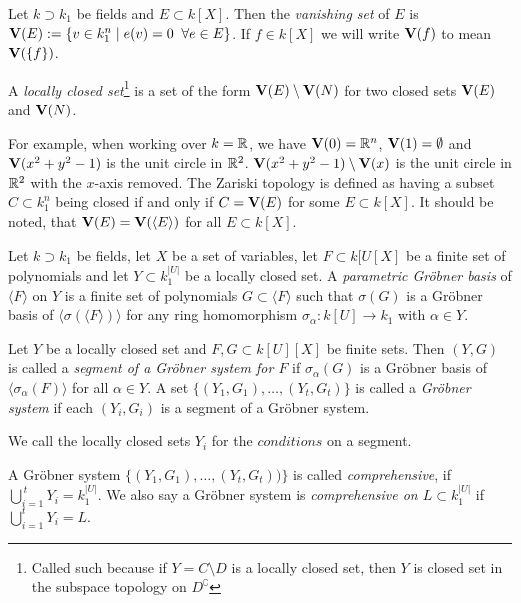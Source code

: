 \begin{definition}
  Let $k \supset k_{1}$ be fields and $E \subset k[X]$. Then the \textit{vanishing set} of $E$ is $\operatorname{\mathbf V}(E) := \{v \in k_{1}^{n} \mid e(v) = 0 \;\; \forall e \in E\}$.  If $f \in k[X]$ we will write $\operatorname{\mathbf V}(f)$ to mean $\operatorname{\mathbf V}(\{f\})$.

  A \textit{locally closed set}\footnote{Called such because if $Y = C \setminus D$ is a locally closed set, then $Y$ is closed set in the subspace topology on $D^{\complement}$} is a set of the form $\operatorname{\mathbf V}(E) \setminus \operatorname{\mathbf V}(N)$ for two closed sets $\operatorname{\mathbf V}(E)$ and $\operatorname{\mathbf V}(N)$.
\end{definition}

For example, when working over $k = \mathbb{R}$, we have $\operatorname{\mathbf V}(0) = \mathbb{R}^{n}$, $\operatorname{\mathbf V}(1) = \emptyset$ and $\operatorname{\mathbf V}(x^{2} + y^{2} - 1)$ is the unit circle in $\mathbb{R}^{2}$. $\operatorname{\mathbf V}(x^{2} + y^{2} - 1) \setminus \operatorname{\mathbf V}(x)$ is the unit circle in $\mathbb{R}^{2}$ with the  $x$-axis removed. The Zariski topology is defined as having a subset $C \subset k_{1}^{n}$ being closed if and only if $C = \operatorname{\mathbf V}(E)$ for some $E \subset k[X]$. It should be noted, that $\operatorname{\mathbf V}(E) = \operatorname{\mathbf V}(\langle E \rangle)$ for all $E \subset k[X]$.

\begin{definition}
  Let $k \supset k_{1}$ be fields, let $X$ be a set of variables, let $F \subset k[U[X]$ be a finite set of polynomials and let $Y \subset k_{1}^{|U|}$ be a locally closed set. A \textit{parametric Gröbner basis} of $\langle F \rangle$ on $Y$ is a finite set of polynomials $G \subset \langle F \rangle$ such that $\sigma(G)$ is a Gröbner basis of $\langle \sigma(\langle F \rangle) \rangle$ for any ring homomorphism $\sigma_{\alpha} : k[U] \to k_{1}$ with $\alpha \in Y$.
\end{definition}
\begin{definition}
  Let $Y$ be a locally closed set and $F, G \subset k[U][X]$ be finite sets. Then $(Y, G)$ is called a \textit{segment of a Gröbner system for $F$} if $\sigma_{\alpha}(G)$ is a Gröbner basis of $\langle \sigma_{\alpha}(F) \rangle$ for all $\alpha \in Y$. A set $\{(Y_{1}, G_{1}), \dots, (Y_{t}, G_{t})\}$ is called a \textit{Gröbner system} if each $(Y_{i}, G_{i})$ is a segment of a Gröbner system.

  We call the locally closed sets $Y_{i}$ for the $\textit{conditions}$ on a segment.

  A Gröbner system $\{(Y_{1}, G_{1}), \dots, (Y_{t}, G_{t}))\}$ is called \textit{comprehensive}, if $\bigcup_{i=1}^{\,t}Y_{i} = k_{1}^{|U|}$. We also say a Gröbner system is \textit{comprehensive on $L \subset k_{1}^{|U|}$} if $\bigcup_{i=1}^{t}Y_{i} = L$.
\end{definition}

